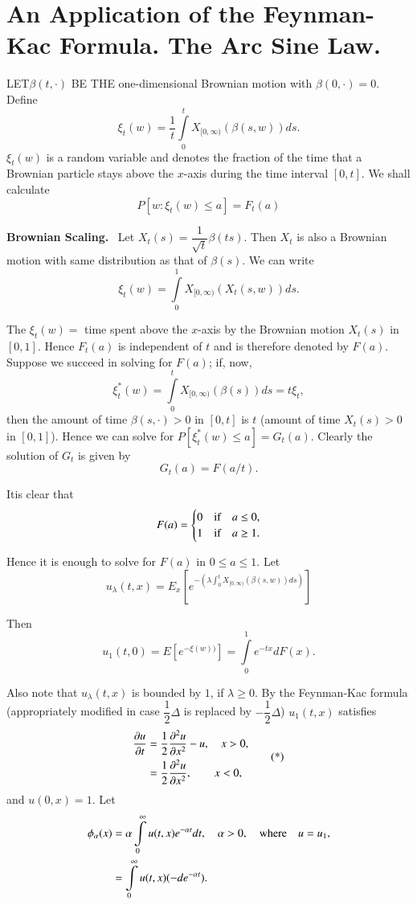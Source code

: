 \chapter[An Application of the Feynman-Kac Formula....]{An Application of the Feynman-Kac Formula. The Arc Sine Law.}\label{chap19}


LET\pageoriginale $\beta(t,\cdot)$ BE THE one-dimensional Brownian
motion with $\beta(0,\cdot)=0$. Define
$$
\xi_{t}(w)=\frac{1}{t}\int\limits^{t}_{0}X_{[0,\infty)}(\beta(s,w))ds.
$$
$\xi_{t}(w)$ is a random variable and denotes the fraction of the time
  that a Brownian particle stays above the $x$-axis during the time
  interval $[0,t]$. We shall calculate
$$
P[w:\xi_{t}(w)\leq a]=F_{t}(a)
$$

\noindent
{\bf Brownian Scaling.}~ Let
$X_{t}(s)=\dfrac{1}{\sqrt{t}}\beta(ts)$. Then $X_{t}$ is also a
Brownian motion with same distribution as that of $\beta(s)$. We can
write 
$$
\xi_{t}(w)=\int\limits^{1}_{0}X_{[0,\infty)}(X_{t}(s,w))ds.
$$

The $\xi_{t}(w)=$ time spent above the $x$-axis by the Brownian motion
$X_{t}(s)$ in $[0,1]$. Hence $F_{t}(a)$ is independent of $t$ and is
therefore denoted by $F(a)$. Suppose we succeed in solving for $F(a)$;
if, now,
$$
\xi^{*}_{t}(w)=\int\limits^{t}_{0}X_{[0,\infty)}(\beta(s))ds=t\xi_{t},
$$
then the amount of time $\beta(s,\cdot)>0$ in $[0,t]$ is $t$ (amount
of time $X_{t}(s)>0$ in $[0,1]$). Hence we can solve for
$P[\xi^{*}_{t}(w)\leq a]=G_{t}(a)$. Clearly the solution of $G_{t}$ is
given by 
$$
G_{t}(a)=F(a/t).
$$

It\pageoriginale is clear that
$$
F(a)=
\begin{cases}
0 & \text{if}\quad a\leq 0,\\
1 & \text{if}\quad a\geq 1.
\end{cases}
$$

Hence it is enough to solve for $F(a)$ in $0\leq a\leq 1$. Let 
$$
u_{\lambda}(t,x)=E_{x}[e^{-(\lambda\int^{t}_{0}X_{[0,\infty)}(\beta(s,w))ds)}]
$$

Then 
$$
u_{1}(t,0)=E[e^{-\xi(w))}]=\int\limits^{1}_{0}e^{-tx}dF(x).
$$

Also note that $u_{\lambda}(t,x)$ is bounded by $1$, if $\lambda \geq
0$. By the Feynman-Kac formula (appropriately modified in case
$\dfrac{1}{2}\Delta$ is replaced by $-\dfrac{1}{2}\Delta$)
$u_{1}(t,x)$ satisfies
\begin{equation*}
\begin{split}
\frac{\partial u}{\partial t} &= \frac{1}{2}\frac{\partial^{2}u}{\partial x^{2}}-u,\quad x>0,\\
&= \frac{1}{2}\frac{\partial^{2}u}{\partial x^{2}},\qquad x<0,
\end{split}\tag{*}
\end{equation*}
and $u(0,x)=1$. Let
\begin{align*}
\phi_{\alpha}(x) &= \alpha\int\limits^{\infty}_{0}u(t,x)e^{-\alpha
  t}dt,\quad \alpha>0,\quad\text{where}\quad u=u_{1},\\
&= \int\limits^{\infty}_{0}u(t,x)(-de^{-\alpha t}).
\end{align*}

